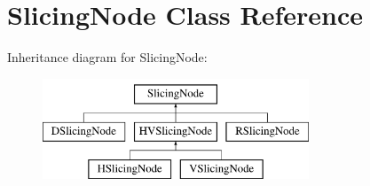 \hypertarget{class_open_chams_1_1_slicing_node}{\section{Slicing\-Node Class Reference}
\label{class_open_chams_1_1_slicing_node}
}
Inheritance diagram for Slicing\-Node\-:\begin{figure}[H]
\begin{center}
\leavevmode
\includegraphics[height=3.000000cm]{class_open_chams_1_1_slicing_node}
\end{center}
\end{figure}

